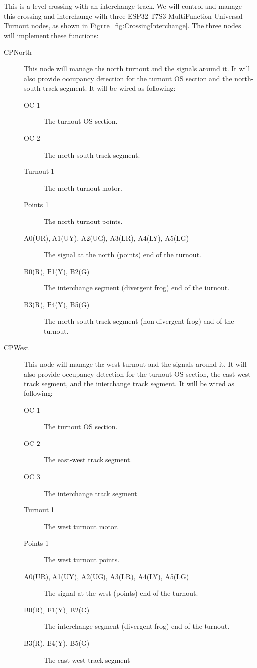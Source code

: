 This is a level crossing with an interchange track.  We will control and 
manage this crossing and interchange with three ESP32 T7S3 MultiFunction 
Universal Turnout nodes, as shown in Figure~\ref{fig:CrossingInterchange}. The 
three nodes will implement these functions:

\begin{description}
\item [CPNorth] This node will manage the north turnout and the signals around 
it.  It will also provide occupancy detection for the turnout OS section and 
the north-south track segment. It will be wired as following:
\begin{description}
\item [OC 1] The turnout OS section.
\item [OC 2] The north-south track segment.
\item [Turnout 1] The north turnout motor.
\item [Points 1] The north turnout points.
\item [A0(UR), A1(UY), A2(UG), A3(LR), A4(LY), A5(LG)] The signal at the north 
(points) end of the turnout.
\item [B0(R), B1(Y), B2(G)] The interchange segment (divergent frog) 
end of the turnout.
\item [B3(R), B4(Y), B5(G)] The north-south track segment 
(non-divergent frog) end of the turnout.
\end{description} 
\item [CPWest] This node will manage the west turnout and the signals 
around it.  It will also provide occupancy detection for the turnout OS 
section, the east-west track segment, and the interchange track segment.  It 
will be wired as following: 
\begin{description}
\item [OC 1] The turnout OS section.
\item [OC 2] The east-west track segment.
\item [OC 3] The interchange track segment
\item [Turnout 1] The west turnout motor.
\item [Points 1] The west turnout points.
\item [A0(UR), A1(UY), A2(UG), A3(LR), A4(LY), A5(LG)] The signal at the west 
(points) end of the turnout.
\item [B0(R), B1(Y), B2(G)] The interchange segment (divergent frog) 
end of the turnout.
\item [B3(R), B4(Y), B5(G)] The east-west track segment 

\end{description}
\end{description}
